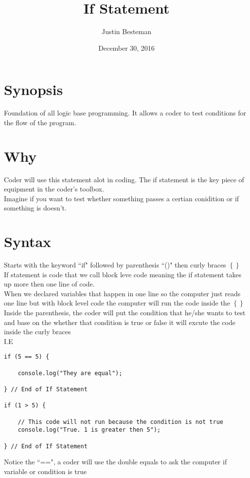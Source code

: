 \documentclass[12pt, letterpaper]{article}
\title{If Statement}
\author{Justin Besteman}
\date{December 30, 2016}
\begin{document}
\maketitle


\section*{Synopsis}

Foundation of all logic base programming. It allows a coder to test conditions for the flow of the program.

\section*{Why}

Coder will use this statement alot in coding. The if statement is the key piece of equipment in the coder's toolbox.\\
Imagine if you want to test whether something passes a certian conidition or if something is doesn't.

\section*{Syntax}

Starts with the keyword ``if" followed by parenthesis ``()" then curly braces $\left\{\right\}$ \\
If statement is code that we call block leve code meaning the if statement takes up more then one line of code.\\
When we declared variables that happen in one line so the computer just reads one line but with block level code the computer will run the code inside the $\left\{\right\}$ \\
Inside the parenthesis, the coder will put the condition that he/she wants to test and base on the whether that condition is true or false it will excute the code inside the curly braces \\
I.E\\
\begin{lstlisting}
if (5 == 5) {

	console.log("They are equal");

} // End of If Statement

if (1 > 5) {

	// This code will not run because the condition is not true
	console.log("True. 1 is greater then 5");

} // End of If Statement
\end{lstlisting}
Notice the  ``==", a coder will use the double equals to ask the computer if variable or condition is true 
\end{document}
